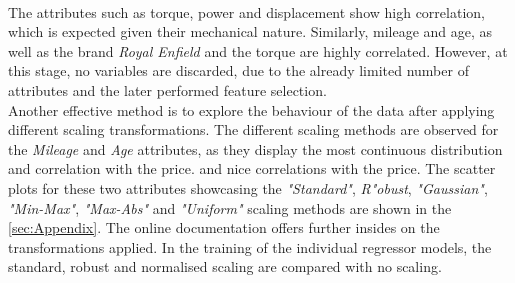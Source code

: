 \\The attributes such as torque, power and displacement show high correlation, which is expected given their mechanical nature.
Similarly, mileage and age, as well as the brand \textit{Royal Enfield} and the torque are highly correlated. However, at this stage,
no variables are discarded, due to the already limited number of attributes and the later performed feature selection.\\
Another effective method is to explore the behaviour of the data after applying different scaling transformations. 
The different scaling methods are observed for the \textit{Mileage} and \textit{Age} attributes, as they display the most continuous distribution and correlation with the price.
and nice correlations with the price. The scatter plots for these two attributes showcasing the \textit{"Standard"}, \textit{R"obust}, \textit{"Gaussian"},
\textit{"Min-Max"}, \textit{"Max-Abs"} and \textit{"Uniform"} scaling methods are shown in the \autoref{sec:Appendix}. The online documentation offers 
further insides on the transformations applied.
In the training of the individual regressor models, the standard, robust and normalised scaling are compared with no scaling.

